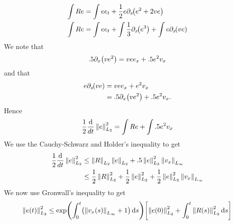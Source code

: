 \documentclass[final]{amsart}
\numberwithin{equation}{section}
\begin{document}
\begin{equation}
\begin{aligned}
\int Re&=\int e e_t +\frac{1}{2}e\partial_x{\!\left({e^2+2ve}\right)}\\
\int Re&=\int e e_t +\int \frac{1}{3}\partial_x{\!\left({e^3}\right)}+\int e\partial_x{\!\left({ve}\right)}
\end{aligned}
\end{equation}
We note that 
\begin{equation}
.5\partial_x\!\left({ve^2}\right) = {vee_x}+.5{e^2v_x}
\end{equation}
and that
\begin{equation}
\begin{aligned}
 e\partial_x{\!\left({ve}\right)}&= {vee_x}+{e^2v_x}\\
&=.5\partial_x\!\left({ve^2}\right)+.5{e^2v_x}.
\end{aligned}
\end{equation}
Hence
\begin{equation}
\begin{aligned}
\frac{1}{2}\frac{\mathrm{d}}{dt}\left\|e\right\|^2_{L_2}=\int Re +\int.5 e^2 v_x
\end{aligned}
\end{equation}
We use the Cauchy-Schwarz and Holder's inequality to get
\begin{equation}
\begin{aligned}
\frac{1}{2}\frac{\mathrm{d}}{dt}\left\|e\right\|^2_{L_2}&\leq\left\|R\right\|_{L_2}\left\|e\right\| _{L_2}+.5 \left\|e\right\|^2_{L_2}\left\|v_x\right\|_{L_\infty}\\
&\leq\frac{1}{2}\left\|R\right\|^2_{L_2}+\frac{1}{2}\left\|e\right\|^2_{L_2}+\frac{1}{2} \left\|e\right\|^2_{L_2}\left\|v_x\right\|_{L_\infty}\\
\end{aligned}
\end{equation}
We now use Gronwall's inequality to get
\begin{equation}
\begin{aligned}
\left\|e\!\left({t}\right)\right\|^2_{L_2}\leq \exp\!\left({\int_0^t\!\left({\left\|v_x\!\left({s}\right)\right\|_{L_\infty}+1}\right)\mathrm{d}s}\right)\!\left[{\left\|e\!\left({0}\right)\right\|_{L_2}^2+\int_0^t\left\|R\!\left({s}\right)\right\|^2_{L_2}\mathrm{d}s}\right]
\end{aligned}
\end{equation}







\end{document}
